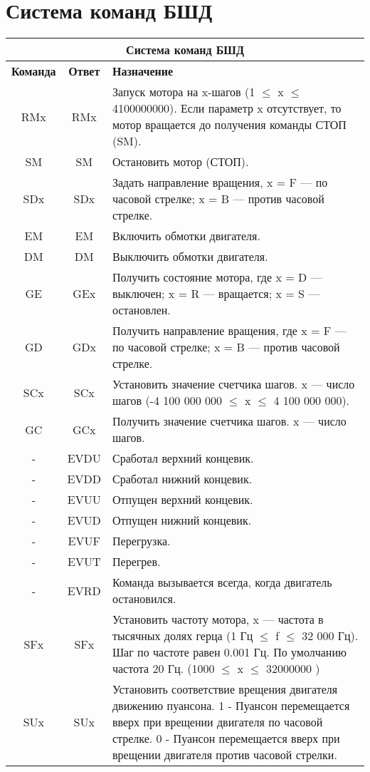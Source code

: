 \part{Система команд БШД}

\begin{tabular}{|c|c|p{10cm}|}
\hline
\multicolumn{3}{|c|}{\textbf{Система команд БШД}} \\
\hline
\bfseries Команда & \bfseries Ответ & \bfseries Назначение\\
\hline
RMx & RMx & Запуск мотора на x-шагов (1 $\leq$ x $\leq$ 4100000000).
 Если параметр x отсутствует, то мотор вращается до получения команды СТОП (SM).\\
\hline
SM & SM & Остановить мотор (СТОП).\\
\hline
SDx & SDx & Задать направление вращения, x = F --- по часовой стрелке; x = B --- против часовой стрелке.\\
\hline
EM & EM & Включить обмотки двигателя.\\
\hline
DM & DM & Выключить обмотки двигателя.\\
\hline
GE & GEx & Получить состояние мотора, где x = D --- выключен;
 x = R --- вращается; x = S --- остановлен.\\
\hline
GD & GDx & Получить направление вращения, где x = F --- по часовой стрелке;
 x = B --- против часовой стрелке.\\
\hline
SCx & SCx & Установить значение счетчика шагов. x --- число шагов (-4 100 000 000 $\leq$ x $\leq$ 4 100 000 000).\\
\hline
GC & GCx & Получить значение счетчика шагов. x --- число шагов.\\
\hline
- & EVDU & Сработал верхний концевик.\\
\hline
- & EVDD & Сработал нижний концевик.\\
\hline
- & EVUU & Отпущен верхний концевик.\\
\hline
- & EVUD & Отпущен нижний концевик.\\
\hline
- & EVUF & Перегрузка.\\
\hline
- & EVUT & Перегрев.\\
\hline
- & EVRD & Команда вызывается всегда, когда двигатель остановился.\\
\hline
SFx & SFx & Установить частоту мотора, x --- частота в тысячных долях герца (1 Гц $\leq$ f $\leq$ 32 000 Гц).
Шаг по частоте равен 0.001 Гц. По умолчанию частота 20 Гц. (1000 $\leq$ x $\leq$ 32000000 )\\
\hline
SUx & SUx & Установить соответствие врещения двигателя движению пуансона.
     1 - Пуансон перемещается вверх при врещении двигателя по часовой стрелке.
     0 - Пуансон перемещается вверх при врещении двигателя против часовой стрелки.\\
\hline
\end{tabular}

